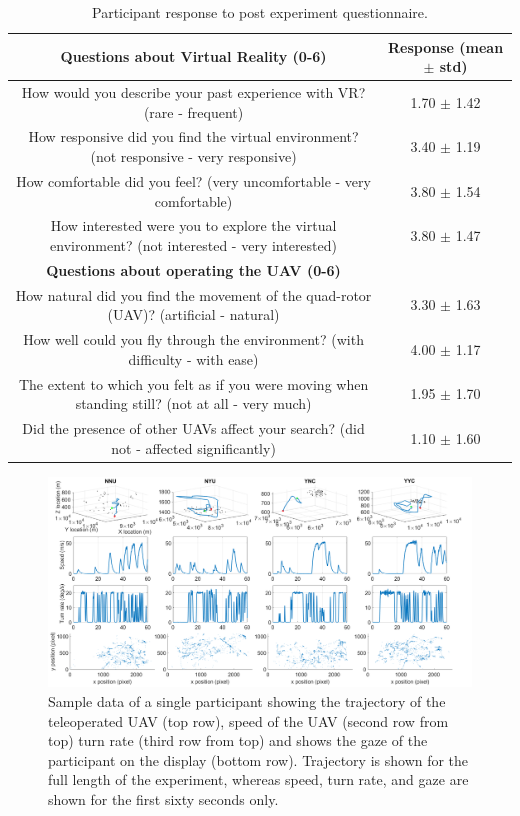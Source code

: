 \documentclass{article}
\begin{document}
	\begin{table}[h!]
		\centering
		\caption{Participant response to post experiment questionnaire.}
		\begin{tabular}{|c||c|}
			\multicolumn{1}{c}{\textbf{Questions about Virtual Reality (0-6)}} & \multicolumn{1}{c}{Response (mean $\pm$ std)} \\ \hline \hline
			How would you describe your past experience with VR? (rare - frequent) & 1.70  $\pm$ 1.42 \\ \hline
			How responsive did you find the virtual environment? (not responsive - very responsive) & 3.40  $\pm$ 1.19 \\ \hline
			How comfortable did you feel? (very uncomfortable - very comfortable) & 3.80  $\pm$ 1.54 \\ \hline
			How interested were you to explore the virtual environment? (not interested - very interested) & 3.80  $\pm$ 1.47 \\ 
			\hline
			
			\multicolumn{1}{c}{\textbf{Questions about operating the UAV (0-6)}} &       \\ \hline
			How natural did you find the movement of the quad-rotor (UAV)? (artificial - natural) & 3.30  $\pm$ 1.63 \\  \hline
			How well could you fly through the environment? (with difficulty - with ease) & 4.00  $\pm$ 1.17 \\ \hline
			The extent to which you felt as if you were moving when standing still? (not at all - very much) & 1.95  $\pm$ 1.70 \\ \hline
			Did the presence of other UAVs affect your search? (did not - affected significantly) & 1.10  $\pm$ 1.60 \\ \hline
			
		\end{tabular}%
		\label{tab:presenceQuestionnaire}%
	\end{table}%
	
	\begin{figure}[htpb]
		\centering
		\includegraphics[width=1\textwidth]{images/multiPlot.png}
		\caption[width=0.5\textwidth]{Sample data of a single participant showing the trajectory of the teleoperated UAV (top row), speed of the UAV (second row from top) turn rate (third row from top) and shows the gaze of the participant on the display (bottom row). Trajectory is shown for the full length of the experiment, whereas speed, turn rate, and gaze are shown for the first sixty seconds only.}
		\label{fig:multiplot}
	\end{figure}
	
\end{document}
